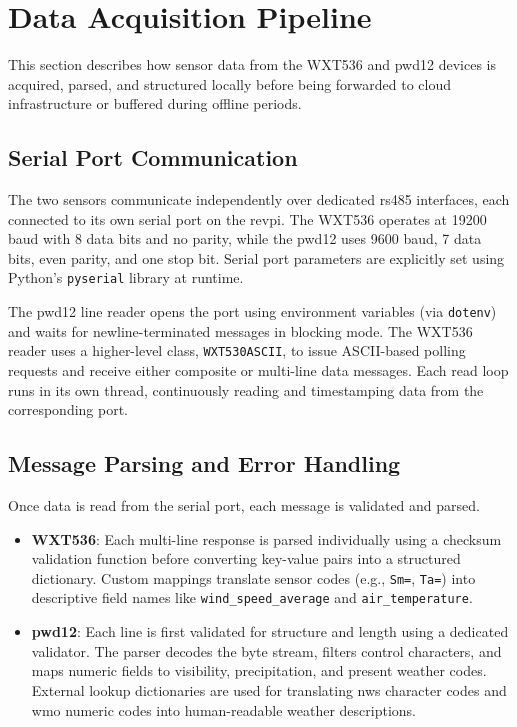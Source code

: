 \section{Data Acquisition Pipeline}
\label{sec:data_pipeline}

This section describes how sensor data from the WXT536 and \gls{pwd12} devices is acquired, parsed, and structured locally before being forwarded to cloud infrastructure or buffered during offline periods.

\subsection{Serial Port Communication}

The two sensors communicate independently over dedicated \gls{rs485} interfaces, each connected to its own serial port on the \gls{revpi}. The WXT536 operates at 19200 baud with 8 data bits and no parity, while the \gls{pwd12} uses 9600 baud, 7 data bits, even parity, and one stop bit. Serial port parameters are explicitly set using Python's \texttt{pyserial} library at runtime.

The \gls{pwd12} line reader opens the port using environment variables (via \texttt{dotenv}) and waits for newline-terminated messages in blocking mode. The WXT536 reader uses a higher-level class, \texttt{WXT530ASCII}, to issue ASCII-based polling requests and receive either composite or multi-line data messages. Each read loop runs in its own thread, continuously reading and timestamping data from the corresponding port.

\subsection{Message Parsing and Error Handling}

Once data is read from the serial port, each message is validated and parsed.

\begin{itemize}
    \item \textbf{WXT536}: Each multi-line response is parsed individually using a checksum validation function before converting key-value pairs into a structured dictionary. Custom mappings translate sensor codes (e.g., \texttt{Sm=}, \texttt{Ta=}) into descriptive field names like \texttt{wind\_speed\_average} and \texttt{air\_temperature}.
    \item \textbf{\gls{pwd12}}: Each line is first validated for structure and length using a dedicated validator. The parser decodes the byte stream, filters control characters, and maps numeric fields to visibility, precipitation, and present weather codes. External lookup dictionaries are used for translating \gls{nws} character codes and \gls{wmo} numeric codes into human-readable weather descriptions.
\end{itemize}

